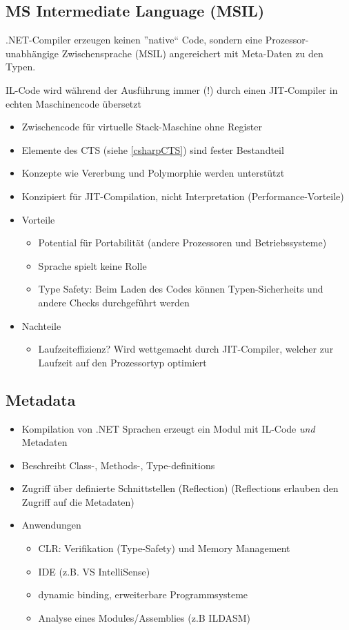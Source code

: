 \subsection{MS Intermediate Language (MSIL)}
.NET-Compiler erzeugen keinen ''native`` Code, sondern eine
Prozessor-unabhängige Zwischensprache (MSIL) angereichert mit
Meta-Daten zu den Typen.

IL-Code wird während der Ausführung immer (!) durch einen JIT-Compiler
in echten Maschinencode übersetzt

\begin{itemize}
	\item Zwischencode für virtuelle Stack-Maschine ohne Register
	\item Elemente des CTS (siehe \ref{csharpCTS}) sind fester Bestandteil
	\item Konzepte wie Vererbung und Polymorphie werden unterstützt
	\item Konzipiert für JIT-Compilation, nicht Interpretation (Performance-Vorteile)
	\item Vorteile
		\begin{itemize}
			\item Potential für Portabilität (andere Prozessoren und Betriebssysteme)
			\item Sprache spielt keine Rolle
			\item Type Safety: Beim Laden des Codes können Typen-Sicherheits und andere Checks durchgeführt werden
		\end{itemize}
	\item Nachteile
		\begin{itemize}
			\item Laufzeiteffizienz? Wird wettgemacht durch JIT-Compiler, welcher zur Laufzeit auf den Prozessortyp optimiert
		\end{itemize}

\end{itemize}

\subsection{Metadata}
\begin{itemize}
	\item Kompilation von .NET Sprachen erzeugt ein Modul mit IL-Code \emph{und} Metadaten
	\item Beschreibt Class-, Methods-, Type-definitions
	\item Zugriff über definierte Schnittstellen (Reflection) \newline
	      (Reflections erlauben den Zugriff auf die Metadaten)
	\item Anwendungen
		\begin{itemize}
			\item CLR: Verifikation (Type-Safety) und Memory Management
			\item IDE (z.B. VS IntelliSense)
			\item dynamic binding, erweiterbare Programmsysteme
			\item Analyse eines Modules/Assemblies (z.B ILDASM)
		\end{itemize}
\end{itemize}

